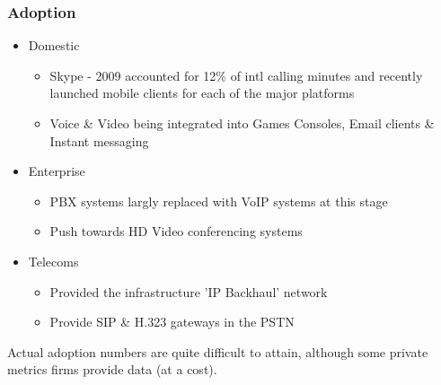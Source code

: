 \begin{frame}
\frametitle{Adoption}

	\begin{itemize}

	\item Domestic
		\begin{itemize}
			\item Skype - 2009 accounted for 12\% of intl calling minutes and recently launched mobile clients for each of the major platforms
			\item Voice \& Video being integrated into Games Consoles, Email clients \& Instant messaging
		\end{itemize}
	\pause
	\item Enterprise
		\begin{itemize}
			\item PBX systems largly replaced with VoIP systems at this stage
			\item Push towards HD Video conferencing systems
		\end{itemize}
	\pause
	\item Telecoms
		\begin{itemize}

			\item Provided the infrastructure 'IP Backhaul' network
			\item Provide SIP \& H.323 gateways in the PSTN
		\end{itemize}

	\end{itemize}
	\pause
	Actual adoption numbers are quite difficult to attain, although some private metrics firms provide data (at a cost).

\end{frame}


